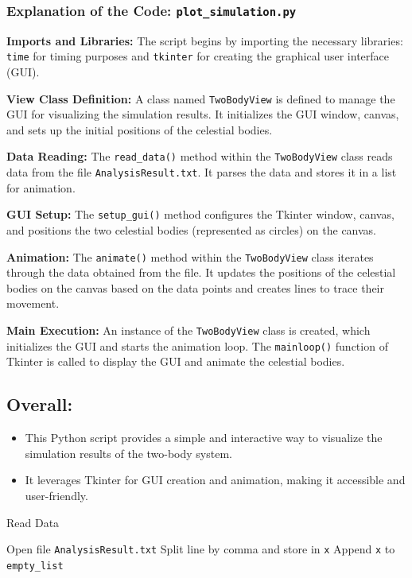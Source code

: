 \documentclass{article}
\begin{document}
\newpage
\subsubsection*{Explanation of the Code: \texttt{plot\_simulation.py}}

\textbf{Imports and Libraries:}
The script begins by importing the necessary libraries: \texttt{time} for timing purposes and \texttt{tkinter} for creating the graphical user interface (GUI).

\textbf{View Class Definition:}
A class named \texttt{TwoBodyView} is defined to manage the GUI for visualizing the simulation results. It initializes the GUI window, canvas, and sets up the initial positions of the celestial bodies.

\textbf{Data Reading:}
The \texttt{read\_data()} method within the \texttt{TwoBodyView} class reads data from the file \texttt{AnalysisResult.txt}. It parses the data and stores it in a list for animation.

\textbf{GUI Setup:}
The \texttt{setup\_gui()} method configures the Tkinter window, canvas, and positions the two celestial bodies (represented as circles) on the canvas.

\textbf{Animation:}
The \texttt{animate()} method within the \texttt{TwoBodyView} class iterates through the data obtained from the file. It updates the positions of the celestial bodies on the canvas based on the data points and creates lines to trace their movement.

\textbf{Main Execution:}
An instance of the \texttt{TwoBodyView} class is created, which initializes the GUI and starts the animation loop. The \texttt{mainloop()} function of Tkinter is called to display the GUI and animate the celestial bodies.

\subsection*{Overall:}
\begin{itemize}[label=-]
    \item This Python script provides a simple and interactive way to visualize the simulation results of the two-body system.
    \item It leverages Tkinter for GUI creation and animation, making it accessible and user-friendly.
\end{itemize}

\begin{algorithm}
\caption{Read Data}
\begin{algorithmic}[1]
    \State Open file \texttt{AnalysisResult.txt}
        \State Split line by comma and store in \texttt{x}
        \State Append \texttt{x} to \texttt{empty\_list}
    \EndFor
\EndFunction
\end{algorithmic}
\end{algorithm}
\end{document}
